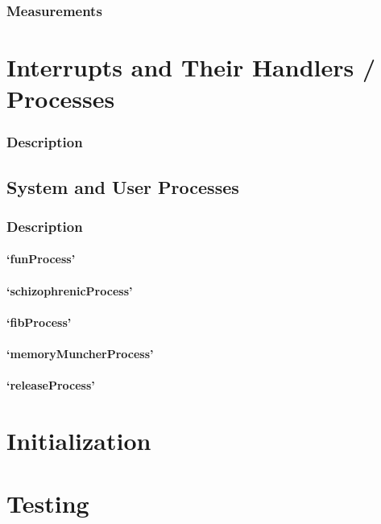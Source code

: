 \documentclass[12pt]{report}
\begin{document}
\section{Measurements}

\part{Interrupts and Their Handlers / Processes}

\section{Description}

\chapter{System and User Processes}

\section{Description}

\subsection{`funProcess'}

\subsection{`schizophrenicProcess'}

\subsection{`fibProcess'}

\subsection{`memoryMuncherProcess'}

\subsection{`releaseProcess'}

\part{Initialization}

\part{Testing}
\end{document}

